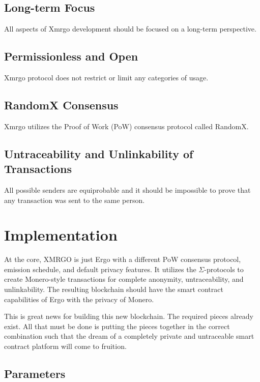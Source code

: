 \documentclass{article}
\begin{document}
\subsection*{Long-term Focus}

\indent All aspects of Xmrgo development should be focused on a long-term 
perspective.

\subsection*{Permissionless and Open}

\indent Xmrgo protocol does not restrict or limit any categories of usage.

\subsection*{RandomX Consensus}

\indent Xmrgo utilizes the Proof of Work (PoW) consensus protocol called RandomX.

\subsection*{Untraceability and Unlinkability of Transactions}

\indent All possible senders are equiprobable and it should be impossible to 
prove that any transaction was sent to the same person.

\section*{Implementation}

\indent At the core, XMRGO is just Ergo with a different PoW consensus 
protocol, emission schedule, and default privacy features. It utilizes the 
$\Sigma$-protocols to create Monero-style transactions for complete 
anonymity, untraceability, and unlinkability. The resulting blockchain should 
have the smart contract capabilities of Ergo with the privacy of Monero.

\indent This is great news for building this new blockchain. The required 
pieces already exist. All that must be done is putting the pieces together 
in the correct combination such that the dream of a completely private and 
untraceable smart contract platform will come to fruition.

\subsection*{Parameters}
\end{document}
